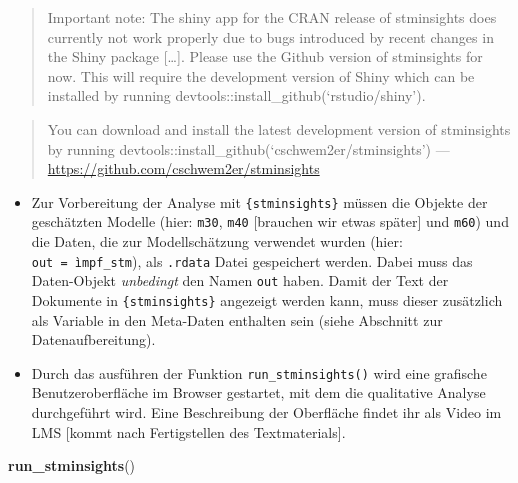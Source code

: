 \documentclass[
]{book}
\newenvironment{Shaded}{\begin{snugshade}}{\end{snugshade}}
\newcommand{\KeywordTok}[1]{\textcolor[rgb]{0.13,0.29,0.53}{\textbf{#1}}}
\newcommand{\NormalTok}[1]{#1}
\providecommand{\tightlist}{%
  \setlength{\itemsep}{0pt}\setlength{\parskip}{0pt}}
\begin{document}
\begin{quote}
Important note: The shiny app for the CRAN release of stminsights does currently not work properly due to bugs introduced by recent changes in the Shiny package {[}\ldots{]}. Please use the Github version of stminsights for now. This will require the development version of Shiny which can be installed by running devtools::install\_github(`rstudio/shiny').
\end{quote}

\begin{quote}
You can download and install the latest development version of stminsights by running devtools::install\_github(`cschwem2er/stminsights') --- \url{https://github.com/cschwem2er/stminsights}
\end{quote}

\begin{itemize}
\tightlist
\item
  Zur Vorbereitung der Analyse mit \texttt{\{stminsights\}} müssen die Objekte der geschätzten Modelle (hier: \texttt{m30}, \texttt{m40} {[}brauchen wir etwas später{]} und \texttt{m60}) und die Daten, die zur Modellschätzung verwendet wurden (hier: \texttt{out\ =\ ìmpf\_stm}), als \texttt{.rdata} Datei gespeichert werden. Dabei muss das Daten-Objekt \emph{unbedingt} den Namen \texttt{out} haben. Damit der Text der Dokumente in \texttt{\{stminsights\}} angezeigt werden kann, muss dieser zusätzlich als Variable in den Meta-Daten enthalten sein (siehe Abschnitt zur Datenaufbereitung).
\item
  Durch das ausführen der Funktion \texttt{run\_stminsights()} wird eine grafische Benutzeroberfläche im Browser gestartet, mit dem die qualitative Analyse durchgeführt wird. Eine Beschreibung der Oberfläche findet ihr als Video im LMS {[}kommt nach Fertigstellen des Textmaterials{]}.
\end{itemize}

\begin{Shaded}
\begin{Highlighting}[]
\KeywordTok{run_stminsights}\NormalTok{()}
\end{Highlighting}
\end{Shaded}
\end{document}
